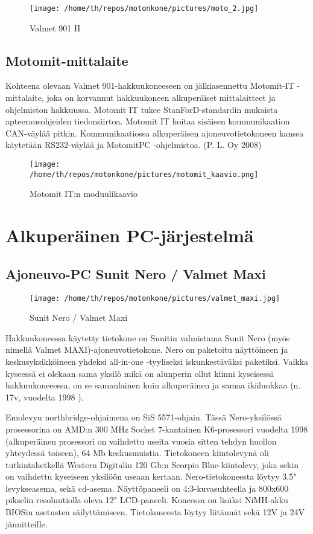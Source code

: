 \documentclass[11pt,a4paper,oneside,article]{memoir}
\begin{document}
\begin{figure}[H]
\centering
\texttt{[image: /home/th/repos/motonkone/pictures/moto\_2.jpg]}
\caption{Valmet 901 II}
\end{figure}

\subsection{Motomit-mittalaite}

Kohteena olevaan Valmet 901-hakkuukoneeseen on jälkiasennettu Motomit-IT
-mittalaite, joka on korvannut hakkuukoneen alkuperäiset mittalaitteet
ja ohjelmiston hakkuussa. Motomit IT tukee StanForD-standardin mukaista
apteerausohjeiden tiedonsiirtoa. Motomit IT hoitaa sisäisen
kommunikaation CAN-väylää pitkin. Kommunikaatiossa alkuperäisen
ajoneuvotietokoneen kanssa käytetään RS232-väylää ja MotomitPC
-ohjelmistoa. (P. L. Oy 2008)

\begin{figure}[H]
\centering
\texttt{[image: /home/th/repos/motonkone/pictures/motomit\_kaavio.png]}
\caption{Motomit IT:n moduulikaavio}
\end{figure}

\section{Alkuperäinen PC-järjestelmä}

\subsection{Ajoneuvo-PC Sunit Nero / Valmet Maxi}

\begin{figure}[H]
\centering
\texttt{[image: /home/th/repos/motonkone/pictures/valmet\_maxi.jpg]}
\caption{Sunit Nero / Valmet Maxi}
\end{figure}

Hakkuukoneessa käytetty tietokone on Sunitin valmistama Sunit Nero (myös nimellä Valmet MAXI)-ajoneuvotietokone. Nero on paketoitu näyttöineen ja keskusyksikköineen yhdeksi all-in-one -tyyliseksi iskunkestäväksi paketiksi. Vaikka kyseessä ei olekaan sama yksilö mikä on alunperin ollut kiinni kyseisessä hakkuukoneeessa, on se samanlainen kuin alkuperäinen ja samaa ikäluokkaa (n. 17v, vuodelta 1998 ). 

Emolevyn northbridge-ohjaimena on SiS 5571-ohjain. Tässä Nero-yksilössä prosessorina on AMD:n 300 MHz Socket 7-kantainen K6-prosessori vuodelta 1998 (alkuperäinen prosessori on vaihdettu useita vuosia sitten tehdyn huollon yhteydessä toiseen), 64 Mb keskusmuistia. Tietokoneen kiintolevynä oli tutkintahetkellä Western Digitalin 120 Gb:n Scorpio Blue-kiintolevy, joka sekin on vaihdettu kyseiseen yksilöön useaan kertaan. Nero-tietokoneesta löytyy 3,5" levykseasema, sekä cd-asema. Näyttöpaneeli on 4:3-kuvasuhteella ja 800x600 pikselin resoluutiolla oleva 12" LCD-paneeli. Koneessa on lisäksi NiMH-akku BIOSin asetusten säilyttämiseen. Tietokoneesta löytyy liitännät sekä 12V ja 24V jännitteille.
\end{document}
